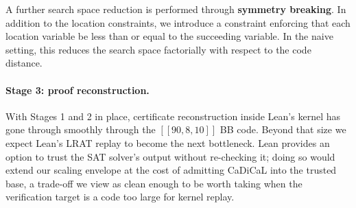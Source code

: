 A further search space reduction is performed through \textbf{symmetry breaking}. In addition to the location constraints, we introduce a constraint enforcing that each location variable be less than or equal to the succeeding variable. In the naive setting, this reduces the search space factorially with respect to the code distance. 

\paragraph{Stage 3: proof reconstruction.} With Stages 1 and 2 in place,
certificate reconstruction inside Lean's kernel has gone through smoothly
through the $[[90, 8, 10]]$ BB code. Beyond that size we expect Lean's LRAT
replay to become the next bottleneck. Lean provides an option to trust the SAT
solver's output without re-checking it; doing so would extend our scaling
envelope at the cost of admitting CaDiCaL into the trusted base, a trade-off we
view as clean enough to be worth taking when the verification target is a code
too large for kernel replay.

